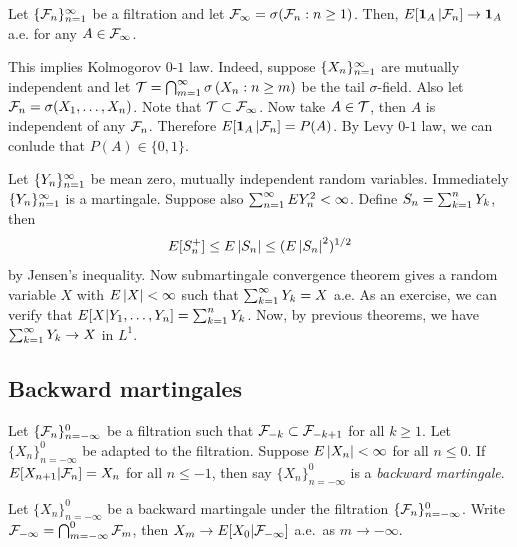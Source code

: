 \documentclass[a4paper]{article}
\begin{document}
\begin{cor}
  Let $\{ \mathcal{F}_n \}_{n=1}^\infty$ be a filtration and let $\mathcal{F}_\infty 
  = \sigma (\mathcal{F}_n : n \geq 1)$. 
  Then, $E [\operatorname{\mathbf{1}}_A | \mathcal{F}_n] \to \operatorname{\mathbf{1}}_A$ a.e. for any $A \in \mathcal{F}_\infty$.
\end{cor}

\begin{remark}
  This implies Kolmogorov $0$-$1$ law. Indeed, suppose 
  $\{ X_n \}_{n=1}^\infty$ are mutually independent and let $\mathcal{T} = 
  \bigcap_{m=1}^\infty \sigma \left( X_n : n \geq m \right)$
  be the tail $\sigma$-field. Also let $\mathcal{F}_n = 
  \sigma (X_1, \dots, X_n)$. Note that 
  $\mathcal{T} \subset \mathcal{F}_\infty$.
  Now take $A \in \mathcal{T}$, then 
  $A$ is independent of any $\mathcal{F}_n$. Therefore 
  $E [\operatorname{\mathbf{1}}_A | \mathcal{F}_n] = P(A)$. By Levy $0$-$1$ law,
  we can conlude that $P(A) \in \{ 0, 1 \}$.
\end{remark}

\begin{eg}
  Let $\{ Y_n \}_{n=1}^\infty$ be mean zero, mutually independent 
  random variables. Immediately $\{ Y_n \}_{n=1}^\infty$ is a martingale. 
  Suppose also $\sum_{n=1}^\infty E Y_n^2 < \infty$.
  Define $S_n = \sum_{k=1}^n Y_k$, then 
  \[
  E [S_n^+] \leq E \left\lvert S_n\right\rvert \leq ( E \left\lvert S_n\right\rvert^2 )^{1/2}
  \]
  by Jensen's inequality. Now submartingale convergence theorem
  gives a random variable $X$ with 
  $E \left\lvert X\right\rvert < \infty$ such that $\sum_{k=1}^\infty Y_k = X$ a.e.
  As an exercise, we can verify that 
  $E [X | Y_1, \dots, Y_n] = \sum_{k=1}^n Y_k$.
  Now, by previous theorems, we have $\sum_{k=1}^\infty Y_k \to X$ in $L^1$.
\end{eg}

\subsection{Backward martingales}

\begin{defi}
  Let $\{\mathcal{F}_n\}_{n = -\infty}^0$ be a filtration 
  such that $\mathcal{F}_{-k} \subset \mathcal{F}_{-k+1}$ for all $k \geq 1$.
  Let $\{X_n\}_{n = -\infty}^0$ be adapted to the filtration.
  Suppose $E \left\lvert X_n\right\rvert < \infty$ for all $n \leq 0$. 
  If $E [X_{n + 1} | \mathcal{F}_n] = X_n$ for all $n \leq -1$, 
  then say $\{X_n\}_{n = -\infty}^0$ is a \emph{backward martingale}.
\end{defi}

\begin{thm}
  Let $\{X_n\}_{n = -\infty}^0$ be a backward martingale
  under the filtration $\{\mathcal{F}_n\}_{n = -\infty}^0$.
  Write $\mathcal{F}_{-\infty} = \bigcap_{m = -\infty}^0 \mathcal{F}_m$, 
  then $X_m \to E[X_0 | \mathcal{F}_{-\infty}]$ a.e.\ as $m \to -\infty$.
\end{thm}
\end{document}

